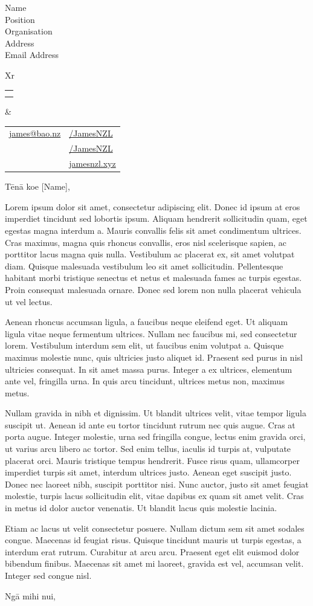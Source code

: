 \documentclass[11pt,a4paper]{letter}[leftmargin=*]
\date{\today}
\makeatletter
\def \fullname {James Bao}
\def \subtitle {}
\def \emailicon {\faAt}
\def \emaillink {mailto:james@bao.nz}
\def \emailtext {james@bao.nz}
\def \phoneicon {\faMobile}
\def \phonetext {+64 22 410 1580}
\def \addressicon {\faMapMarker*}
\def \addresstext {Auckland, New Zealand}
\def \linkedinicon {\faLinkedin}
\def \linkedinlink {https://www.linkedin.com/in/jamesnzl/}
\def \linkedintext {/JamesNZL}
\def \githubicon {\faGithub}
\def \githublink {https://github.com/jamesnzl}
\def \githubtext {/JamesNZL}
\def \websiteicon {\faGlobe}
\def \websitelink {https://jamesnzl.xyz/}
\def \websitetext {jamesnzl.xyz}
\def \headertype {\doublecol} %
\def \email {\emailicon \hspace{3pt}\href{\emaillink}{\emailtext}}
\def \phone {\phoneicon \hspace{3pt}{ \phonetext}}
\def \address {\addressicon \hspace{3pt}{\addresstext}}
\def \linkedin {\linkedinicon \hspace{3pt}\href{\linkedinlink}{\linkedintext}}
\def \github {\githubicon \hspace{3pt}\href{\githublink}{\githubtext}}
\def \website {\websiteicon \hspace{3pt}\href{\websitelink}{\websitetext}}
\newcommand{\doublecol}[6]{
  \begin{tabularx}{\textwidth}{Xr}
    {
      \begin{tabular}[c]{l}
        \fontsize{35}{45}\selectfont{\color{primary}{{\textbf{\fullname}}}} \\
        {\textit{\subtitle}} %
      \end{tabular}
    } & {
      \begin{tabular}[c]{l@{\hspace{1.5em}}l}
        {\small#4} & {\small#1} \\
        {\small#5} & {\small#2} \\
        {\small#6} & {\small#3}
      \end{tabular}
    }
  \end{tabularx}
}
\newcommand{\singlecol}[6]{
  \begin{tabularx}{\textwidth}{Xr}
    {
      \begin{tabular}[b]{l}
        \fontsize{35}{45}\selectfont{\color{primary}{{\textbf{\fullname}}}} \\
        {\textit{\subtitle}} %
      \end{tabular}
    } & {
      \begin{tabular}[c]{l}
        {\small#1} \\
        {\small#2} \\
        {\small#3} \\
        {\small#4} \\
        {\small#5} \\
        {\small#6}
      \end{tabular}
    }
  \end{tabularx}
}
\makeatother
\begin{document}
\begin{letter}{
    Name\\
    Position\\
    Organisation\\
    Address\\
    Email Address
  }


  \begin{flushleft}
    \headertype{\linkedin}{\github}{\website}{\email}{\phone}{\address} %
  \end{flushleft}

  \opening{Tēnā koe [Name],}

  Lorem ipsum dolor sit amet, consectetur adipiscing elit.
  Donec id ipsum at eros imperdiet tincidunt sed lobortis ipsum.
  Aliquam hendrerit sollicitudin quam, eget egestas magna interdum a.
  Mauris convallis felis sit amet condimentum ultrices.
  Cras maximus, magna quis rhoncus convallis, eros nisl scelerisque sapien, ac porttitor lacus magna quis nulla.
  Vestibulum ac placerat ex, sit amet volutpat diam.
  Quisque malesuada vestibulum leo sit amet sollicitudin.
  Pellentesque habitant morbi tristique senectus et netus et malesuada fames ac turpis egestas.
  Proin consequat malesuada ornare.
  Donec sed lorem non nulla placerat vehicula ut vel lectus.

  Aenean rhoncus accumsan ligula, a faucibus neque eleifend eget.
  Ut aliquam ligula vitae neque fermentum ultrices.
  Nullam nec faucibus mi, sed consectetur lorem.
  Vestibulum interdum sem elit, ut faucibus enim volutpat a.
  Quisque maximus molestie nunc, quis ultricies justo aliquet id.
  Praesent sed purus in nisl ultricies consequat.
  In sit amet massa purus.
  Integer a ex ultrices, elementum ante vel, fringilla urna.
  In quis arcu tincidunt, ultrices metus non, maximus metus.

  Nullam gravida in nibh et dignissim.
  Ut blandit ultrices velit, vitae tempor ligula suscipit ut.
  Aenean id ante eu tortor tincidunt rutrum nec quis augue.
  Cras at porta augue.
  Integer molestie, urna sed fringilla congue, lectus enim gravida orci, ut varius arcu libero ac tortor.
  Sed enim tellus, iaculis id turpis at, vulputate placerat orci.
  Mauris tristique tempus hendrerit.
  Fusce risus quam, ullamcorper imperdiet turpis sit amet, interdum ultrices justo.
  Aenean eget suscipit justo.
  Donec nec laoreet nibh, suscipit porttitor nisi.
  Nunc auctor, justo sit amet feugiat molestie, turpis lacus sollicitudin elit, vitae dapibus ex quam sit amet velit.
  Cras in metus id dolor auctor venenatis.
  Ut blandit lacus quis molestie lacinia.

  Etiam ac lacus ut velit consectetur posuere.
  Nullam dictum sem sit amet sodales congue.
  Maecenas id feugiat risus.
  Quisque tincidunt mauris ut turpis egestas, a interdum erat rutrum.
  Curabitur at arcu arcu.
  Praesent eget elit euismod dolor bibendum finibus.
  Maecenas sit amet mi laoreet, gravida est vel, accumsan velit.
  Integer sed congue nisl.

  \closing{Ngā mihi nui,}

\end{letter}
\end{document}
